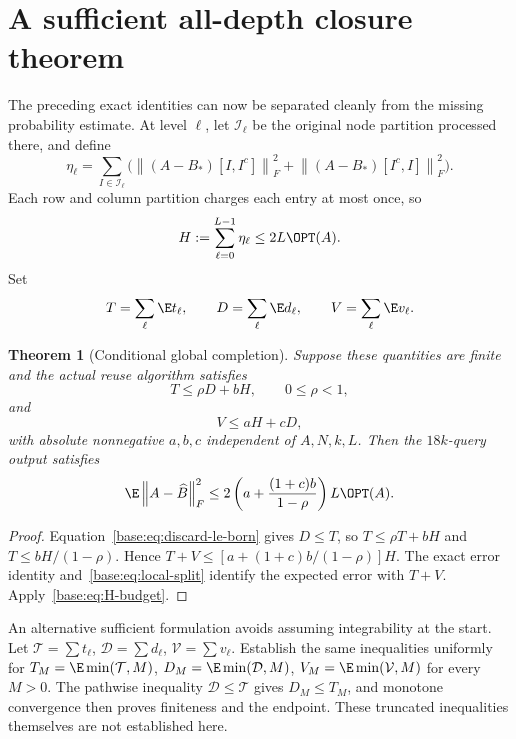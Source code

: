 \documentclass[11pt,oneside,openany,a4paper]{book}
\numberwithin{equation}{chapter}
\newtheorem{theorem}{Theorem}[chapter]
\theoremstyle{definition}
\theoremstyle{remark}
\newcommand{\F}[1]{\left\lVert#1\right\rVert_F}
\begin{document}
\section{A sufficient all-depth closure theorem}\label{base:sec:closure}
The preceding exact identities can now be separated cleanly from the
missing probability estimate. At level $\ell$, let $\mathcal I_\ell$ be
the original node partition processed there, and define
\begin{equation}\label{base:eq:eta}
 \eta_\ell=\sum_{I\in\mathcal I_\ell}
 \bigl(\F{(A-B_*)[I,I^c]}^2+\F{(A-B_*)[I^c,I]}^2\bigr).
\end{equation}
Each row and column partition charges each entry at most once, so
\begin{equation}\label{base:eq:H-budget}
 H:=\sum_{\ell=0}^{L-1}\eta_\ell\le2L\OPT(A).
\end{equation}
Set
\[
 T=\sum_\ell\E t_\ell,\qquad
 D=\sum_\ell\E d_\ell,\qquad
 V=\sum_\ell\E v_\ell.
\]

\begin{theorem}[Conditional global completion]\label{base:thm:closure}
Suppose these quantities are finite and the actual reuse algorithm satisfies
\begin{equation}\label{base:eq:missing-T}
 T\le\rho D+bH,\qquad 0\le\rho<1,
\end{equation}
and
\begin{equation}\label{base:eq:missing-V}
 V\le aH+cD,
\end{equation}
with absolute nonnegative $a,b,c$ independent of $A,N,k,L$.
Then the $18k$-query output satisfies
\begin{equation}\label{base:eq:conditional-endpoint}
 \E\F{A-\widehat B}^2
 \le2\left(a+\frac{(1+c)b}{1-\rho}\right)L\OPT(A).
\end{equation}
\end{theorem}
\begin{proof}
Equation~\eqref{base:eq:discard-le-born} gives $D\le T$, so
$T\le\rho T+bH$ and $T\le bH/(1-\rho)$.
Hence $T+V\le[a+(1+c)b/(1-\rho)]H$.
The exact error identity and~\eqref{base:eq:local-split} identify the expected
error with $T+V$. Apply~\eqref{base:eq:H-budget}.\end{proof}

An alternative sufficient formulation avoids assuming integrability at the
start. Let $\mathcal T=\sum t_\ell$, $\mathcal D=\sum d_\ell$,
$\mathcal V=\sum v_\ell$. Establish the same inequalities uniformly for
$T_M=\E\min(\mathcal T,M)$, $D_M=\E\min(\mathcal D,M)$,
$V_M=\E\min(\mathcal V,M)$ for every $M>0$. The pathwise inequality
$\mathcal D\le\mathcal T$ gives $D_M\le T_M$, and monotone convergence then
proves finiteness and the endpoint. These truncated inequalities themselves
are not established here.
\end{document}
